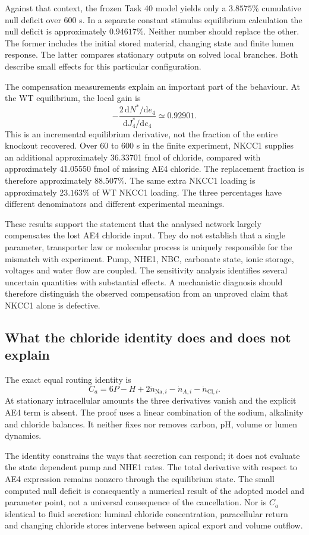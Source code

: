 Against that context, the frozen Task 40 model yields only a $3.8575\%$ cumulative null deficit over 600 s. In a separate constant stimulus equilibrium calculation the null deficit is approximately $0.94617\%$. Neither number should replace the other. The former includes the initial stored material, changing state and finite lumen response. The latter compares stationary outputs on solved local branches. Both describe small effects for this particular configuration.

The compensation measurements explain an important part of the behaviour. At the WT equilibrium, the local gain is
\[
 -\frac{2\,\mathrm dN^*/\mathrm de_4}{\mathrm dJ_4^*/\mathrm de_4}
 \simeq0.92901.
\]
This is an incremental equilibrium derivative, not the fraction of the entire knockout recovered. Over 60 to 600 s in the finite experiment, NKCC1 supplies an additional approximately 36.33701 fmol of chloride, compared with approximately 41.05550 fmol of missing AE4 chloride. The replacement fraction is therefore approximately $88.507\%$. The same extra NKCC1 loading is approximately $23.163\%$ of WT NKCC1 loading. The three percentages have different denominators and different experimental meanings.

These results support the statement that the analysed network largely compensates the lost AE4 chloride input. They do not establish that a single parameter, transporter law or molecular process is uniquely responsible for the mismatch with experiment. Pump, NHE1, NBC, carbonate state, ionic storage, voltages and water flow are coupled. The sensitivity analysis identifies several uncertain quantities with substantial effects. A mechanistic diagnosis should therefore distinguish the observed compensation from an unproved claim that NKCC1 alone is defective.

\subsection{What the chloride identity does and does not explain}
The exact equal routing identity is
\[
 C_a=6P-H+2\dot n_{\mathrm{Na},i}-\dot n_{A,i}-\dot n_{\mathrm{Cl},i}.
\]
At stationary intracellular amounts the three derivatives vanish and the explicit AE4 term is absent. The proof uses a linear combination of the sodium, alkalinity and chloride balances. It neither fixes nor removes carbon, pH, volume or lumen dynamics.

The identity constrains the ways that secretion can respond; it does not evaluate the state dependent pump and NHE1 rates. The total derivative with respect to AE4 expression remains nonzero through the equilibrium state. The small computed null deficit is consequently a numerical result of the adopted model and parameter point, not a universal consequence of the cancellation. Nor is $C_a$ identical to fluid secretion: luminal chloride concentration, paracellular return and changing chloride stores intervene between apical export and volume outflow.

